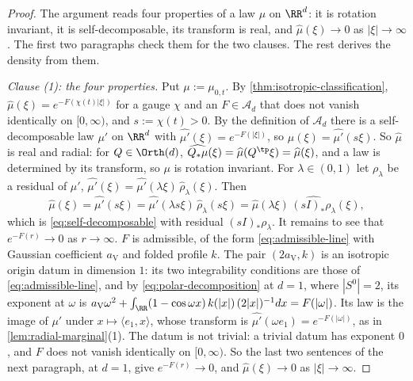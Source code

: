 \begin{proof}
\leanok
The argument reads four properties of a law $\mu$ on $\RR^d$: it is rotation invariant, it is
self-decomposable, its transform is real, and $\widehat\mu(\xi) \to 0$ as $|\xi| \to \infty$. The
first two paragraphs check them for the two clauses. The rest derives the density from them.

\emph{Clause (1): the four properties.} Put $\mu := \mu_{0,t}$. By
\ref{thm:isotropic-classification}, $\widehat\mu(\xi) = e^{-F(\chi(t)|\xi|)}$ for a gauge $\chi$
and an $F \in \mathcal{A}_d$ that does not vanish identically on $[0,\infty)$, and
$s := \chi(t) > 0$. By the definition of $\mathcal{A}_d$ there is a self-decomposable law $\mu'$
on $\RR^d$ with $\widehat{\mu'}(\xi) = e^{-F(|\xi|)}$, so $\widehat\mu(\xi) = \widehat{\mu'}(s\xi)$.
So $\widehat\mu$ is real and radial: for $Q \in \Orth(d)$,
$\widehat{Q_*\mu}(\xi) = \widehat\mu(Q^{\tp}\xi) = \widehat\mu(\xi)$, and a law is determined by its
transform, so $\mu$ is rotation invariant. For $\lambda \in (0,1)$ let $\rho_\lambda$ be a residual
of $\mu'$, $\widehat{\mu'}(\xi) = \widehat{\mu'}(\lambda\xi)\,\widehat\rho_\lambda(\xi)$. Then
\[
  \widehat\mu(\xi) = \widehat{\mu'}(s\xi) = \widehat{\mu'}(\lambda s\xi)\,\widehat\rho_\lambda(s\xi)
   = \widehat\mu(\lambda\xi)\,\widehat{(sI)_*\rho_\lambda}(\xi) ,
\]
which is \ref{eq:self-decomposable} with residual $(sI)_*\rho_\lambda$. It remains to see that
$e^{-F(r)} \to 0$ as $r \to \infty$. $F$ is admissible, of the form \ref{eq:admissible-line} with
Gaussian coefficient $a_{\mathrm V}$ and folded profile $k$. The pair $(2a_{\mathrm V}, k)$ is an
isotropic origin datum in dimension $1$: its two integrability conditions are those of
\ref{eq:admissible-line}, and by \ref{eq:polar-decomposition} at $d = 1$, where $|S^0| = 2$, its
exponent at $\omega$ is
$a_{\mathrm V}\omega^2 + \int_{\RR}(1 - \cos\omega x)\,k(|x|)\,(2|x|)^{-1}dx = F(|\omega|)$. Its
law is the image of $\mu'$ under $x \mapsto \langle e_1, x\rangle$, whose transform is
$\widehat{\mu'}(\omega e_1) = e^{-F(|\omega|)}$, as in \ref{lem:radial-marginal}(1). The datum is
not trivial: a trivial datum has exponent $0$, and $F$ does not vanish identically on $[0,\infty)$.
So the last two sentences of the next paragraph, at $d = 1$, give $e^{-F(r)} \to 0$, and
$\widehat\mu(\xi) \to 0$ as $|\xi| \to \infty$.


\end{proof}
